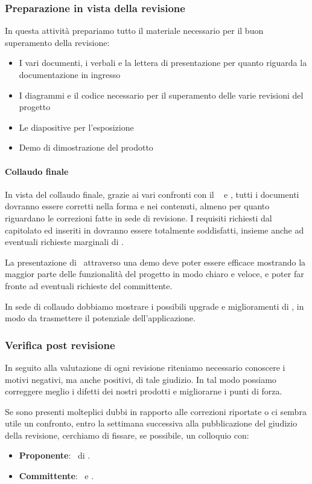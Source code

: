         \subsubsection{Preparazione in vista della revisione}
		In questa attività prepariamo tutto il materiale necessario per il buon superamento della revisione:
		\begin{itemize}
			\item I vari documenti, i verbali e la lettera di presentazione per quanto riguarda la documentazione in ingresso
			\item I diagrammi  e il codice necessario per il superamento delle varie revisioni del progetto
			\item Le diapositive per l'esposizione
            \item Demo di dimostrazione del prodotto
		\end{itemize}
    
        \paragraph{Collaudo finale}
        In vista del collaudo finale, grazie ai vari confronti con il \TV~ e \DZ, tutti i documenti dovranno essere corretti nella forma e nei contenuti, almeno per quanto riguardano le correzioni fatte in sede di revisione. I requisiti richiesti dal capitolato ed inseriti in \AdRd dovranno essere totalmente soddisfatti, insieme anche ad eventuali richieste marginali di \DZ. \par
        La presentazione di \progetto\ attraverso una demo deve poter essere efficace mostrando la maggior parte delle funzionalità del progetto in modo chiaro e veloce, e poter far fronte ad eventuali richieste del committente. \par
        In sede di collaudo dobbiamo mostrare i possibili upgrade e miglioramenti di \progetto, in modo da trasmettere il potenziale dell'applicazione.



		\subsubsection{Verifica post revisione} \label{verificapostrevisione}
        In seguito alla valutazione di ogni revisione riteniamo necessario conoscere i motivi negativi, ma anche positivi, di tale giudizio. In tal modo possiamo correggere meglio i difetti dei nostri prodotti e migliorarne i punti di forza. \par
        Se sono presenti molteplici dubbi in rapporto alle correzioni riportate o ci sembra utile un confronto, entro la settimana successiva alla pubblicazione del giudizio della revisione, cerchiamo di fissare, se possibile, un colloquio con:
        \begin{itemize}
            \item \textbf{Proponente}: \DZ\ di \II.
            \item \textbf{Committente}: \TV\ e \RC.
		\end{itemize}
    

